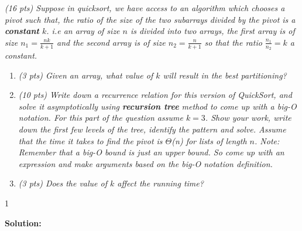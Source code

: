 \documentclass[9pt]{article}
\def\solutions{1}
\begin{document}
\item {\itshape (16 pts) Suppose in quicksort, we have access to an algorithm which chooses a pivot such that, the ratio of the size of the two subarrays divided by the pivot is a \textbf{constant} $k$. i.e an array of size $n$ is divided into two arrays, the first array is of size $n_1 = \frac{nk}{k+1}$ and the second array is of size $n_2 = \frac{n}{k+1}$ so that the ratio $\frac{n_1}{n_2} = k$ a constant. 
	}
	\begin{enumerate}%
	
	\item{\itshape
    (3 pts) Given an array, what value of $k$ will result in the best partitioning?}
    
    \item{\itshape
    (10 pts) Write down a recurrence relation for this version of QuickSort, and solve it asymptotically using \textbf{recursion tree} method to come up with a big-O notation. For this part of the question assume $k= 3$. Show your work, write down the first few levels of the tree, identify the pattern and solve. Assume that the time it takes to find the pivot is $\Theta$(n) for lists of length $n$. Note: Remember that a big-O bound is just an upper bound. So come up with an expression and make arguments based on the big-O notation definition. }
	
	\item{ \itshape
(3 pts) Does the value of $k$ affect the running time?}
		\end{enumerate}
  \if\solutions1
  \vspace{2mm}
  
  \textbf{Solution:}   \\


\fi

\newpage
\end{document}
